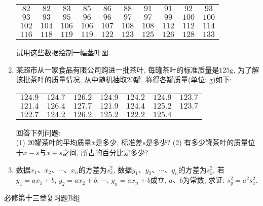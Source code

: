 \documentclass[10pt,a4paper]{article}
\begin{document}
\begin{enumerate}[1.]
\begin{center}
\begin{tabular}{cccccccccc}
        $82$ & $82$ & $83$ & $85$ & $86$ & $88$ & $91$ & $91$ & $92$ & $93$ \\
        $93$ & $93$ & $95$ & $96$ & $96$ & $97$ & $97$ & $99$ & $100$ & $100$ \\
        $102$ & $104$ & $106$ & $106$ & $107$ & $108$ & $108$ & $112$ & $112$ & $114$ \\
        $116$ & $118$ & $119$ & $119$ & $122$ & $123$ & $125$ & $126$ & $128$ & $133$
    \end{tabular}
\end{center}
试用这些数据绘制一幅茎叶图.
\item 某超市从一家食品有限公司购进一批茶叶, 每罐茶叶的标准质量是$125\text{g}$, 为了解该批茶叶的质量情况, 从中随机抽取$20$罐, 称得各罐质量(单位: $\text{g}$)如下:
\begin{center}
    \begin{tabular}{ccccccc}
        $124.9$ & $124.7$ & $126.2$ & $124.9$ & $124.2$ & $124.9$ & $123.7$ \\
        $121.4$ & $126.4$ & $127.7$ & $121.9$ & $124.4$ & $125.2$ & $123.7$ \\
        $122.7$ & $124.2$ & $126.2$ & $125.2$ & $122.2$ & $125.4$
    \end{tabular}
\end{center}
回答下列问题:\\
(1) $20$罐茶叶的平均质量$\bar{x}$是多少, 标准差$s$是多少?
(2) 有多少罐茶叶的质量位于$\bar x-s$与$\bar x +s$之间, 所占的百分比是多少?
\item 数据$x_1$、$x_2$、$\cdots$、$x_n$的方差为$s_x^2$, 数据$y_1$、$y_2$、$\cdots$、$y_n$的方差为$s_y^2$, 若$y_1=ax_1+b$, $y_2=ax_2+b$, $\cdots$, $y_n=ax_n+b$成立, $a$、$b$为常数, 求证: $s_y^2=a^2s_x^2$. 
\end{enumerate}


必修第十三章复习题B组
\end{document}
